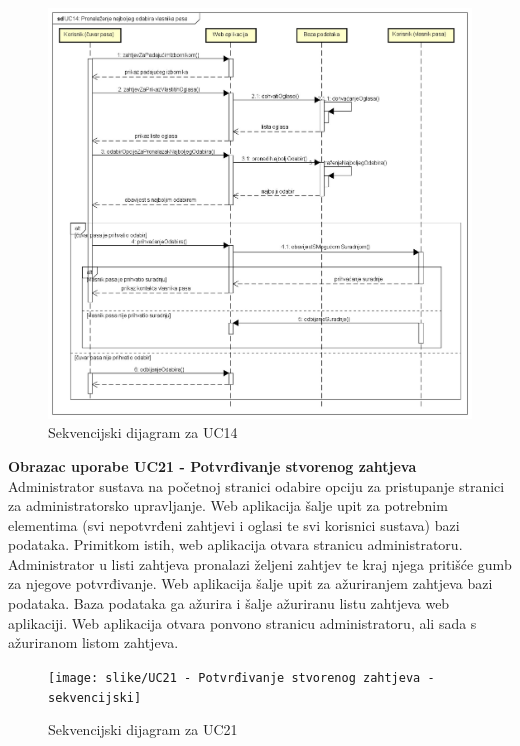 				\begin{figure}[htb]
					\centering
					\includegraphics[width=16cm]{slike/UC14 - sekvencijski}
					\caption{Sekvencijski dijagram za UC14}
					\label{fig:Sekvencijski-UC14}
				\end{figure}
				\eject		
				
				\textbf{Obrazac uporabe UC21 - Potvrđivanje stvorenog zahtjeva}\\
				
				Administrator sustava na početnoj stranici odabire opciju za pristupanje stranici za administratorsko upravljanje. Web aplikacija šalje upit za potrebnim elementima (svi nepotvrđeni zahtjevi i oglasi te svi korisnici sustava) bazi podataka. Primitkom istih, web aplikacija otvara stranicu administratoru. Administrator u listi zahtjeva pronalazi željeni zahtjev te kraj njega pritišće gumb za njegove potvrđivanje. Web aplikacija šalje upit za ažuriranjem zahtjeva bazi podataka. Baza podataka ga ažurira i šalje ažuriranu listu zahtjeva web aplikaciji. Web aplikacija otvara ponvono stranicu administratoru, ali sada s ažuriranom listom zahtjeva.
				
				\begin{figure}[htb]
					\centering
					\texttt{[image: slike/UC21 - Potvrđivanje stvorenog zahtjeva - sekvencijski]}
					\caption{Sekvencijski dijagram za UC21}
					\label{fig:Sekvencijski-UC21}
				\end{figure}
				\eject	
				
